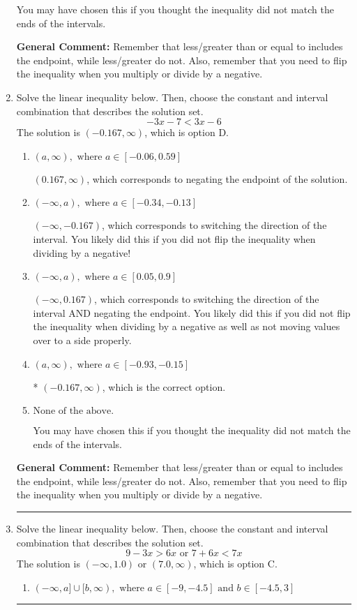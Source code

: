 \documentclass{extbook}[14pt]
\newcommand{\litem}[1]{\item #1

\rule{\textwidth}{0.4pt}}
\begin{document}
\begin{enumerate}
{\begin{enumerate}[label=\Alph*.]
You may have chosen this if you thought the inequality did not match the ends of the intervals.
\end{enumerate}

\textbf{General Comment:} Remember that less/greater than or equal to includes the endpoint, while less/greater do not. Also, remember that you need to flip the inequality when you multiply or divide by a negative.
}
\litem{
Solve the linear inequality below. Then, choose the constant and interval combination that describes the solution set.
\[ -3x -7 < 3x -6 \]The solution is \( (-0.167, \infty) \), which is option D.\begin{enumerate}[label=\Alph*.]
\item \( (a, \infty), \text{ where } a \in [-0.06, 0.59] \)

 $(0.167, \infty)$, which corresponds to negating the endpoint of the solution.
\item \( (-\infty, a), \text{ where } a \in [-0.34, -0.13] \)

 $(-\infty, -0.167)$, which corresponds to switching the direction of the interval. You likely did this if you did not flip the inequality when dividing by a negative!
\item \( (-\infty, a), \text{ where } a \in [0.05, 0.9] \)

 $(-\infty, 0.167)$, which corresponds to switching the direction of the interval AND negating the endpoint. You likely did this if you did not flip the inequality when dividing by a negative as well as not moving values over to a side properly.
\item \( (a, \infty), \text{ where } a \in [-0.93, -0.15] \)

* $(-0.167, \infty)$, which is the correct option.
\item \( \text{None of the above}. \)

You may have chosen this if you thought the inequality did not match the ends of the intervals.
\end{enumerate}

\textbf{General Comment:} Remember that less/greater than or equal to includes the endpoint, while less/greater do not. Also, remember that you need to flip the inequality when you multiply or divide by a negative.
}
\litem{
Solve the linear inequality below. Then, choose the constant and interval combination that describes the solution set.
\[ 9 - 3 x > 6 x \text{ or } 7 + 6 x < 7 x \]The solution is \( (-\infty, 1.0) \text{ or } (7.0, \infty) \), which is option C.\begin{enumerate}[label=\Alph*.]
\item \( (-\infty, a] \cup [b, \infty), \text{ where } a \in [-9, -4.5] \text{ and } b \in [-4.5, 3] \)


\end{enumerate}}
\end{enumerate}
\end{document}
